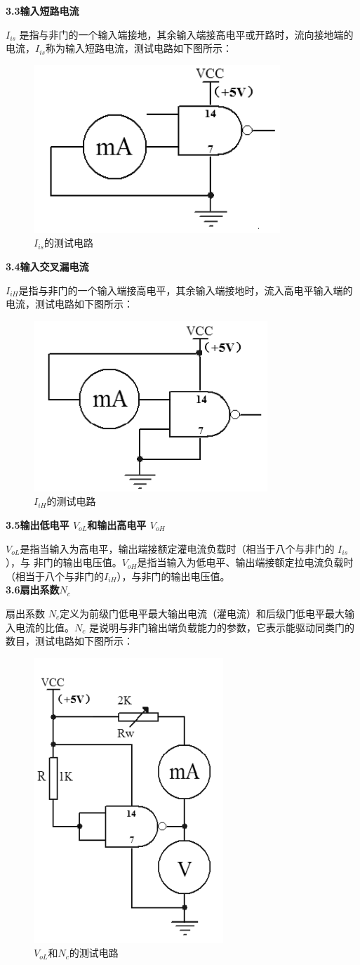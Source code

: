 \documentclass[a4 paper,12pt]{article}
\begin{document}
\noindent
\textbf{3.3输入短路电流}
\par $I_{is}$ 是指与非门的一个输入端接地，其余输入端接高电平或开路时，流向接地端的电流，$I_{is}$称为输入短路电流，测试电路如下图所示：
	\begin{figure}[H]
		\centering
		\hspace{2em}\includegraphics[width=.35\linewidth]{pic/3.png}
		\caption{$I_{is}$的测试电路
		}
	\end{figure}
\noindent
\textbf{3.4输入交叉漏电流}
\par $I_{iH}$是指与非门的一个输入端接高电平，其余输入端接地时，流入高电平输入端的电流，测试电路如下图所示：
	\begin{figure}[H]
		\centering
		\hspace{2em}\includegraphics[width=.35\linewidth]{pic/4.png}
		\caption{$I_{iH}$的测试电路
		}
	\end{figure}
\noindent
\textbf{3.5输出低电平 $V_{oL}$和输出高电平 $V_{oH}$}
\par $V_{oL}$是指当输入为高电平，输出端接额定灌电流负载时（相当于八个与非门的 $I_{is}$），与
非门的输出电压值。$V_{oH}$是指当输入为低电平、输出端接额定拉电流负载时（相当于八个与非门的$I_{iH}$），与非门的输出电压值。\\
\noindent
\textbf{3.6扇出系数$N_{c}$}
\par 扇出系数 $N_{c}$定义为前级门低电平最大输出电流（灌电流）和后级门低电平最大输入电流的比值。$N_{c}$ 是说明与非门输出端负载能力的参数，它表示能驱动同类门的数目，测试电路如下图所示：
	\begin{figure}[H]
		\centering
		\hspace{2em}\includegraphics[width=.3\linewidth]{pic/5.png}
		\caption{$V_{oL}$和$N_{c}$的测试电路
		}
	\end{figure}
\end{document}
